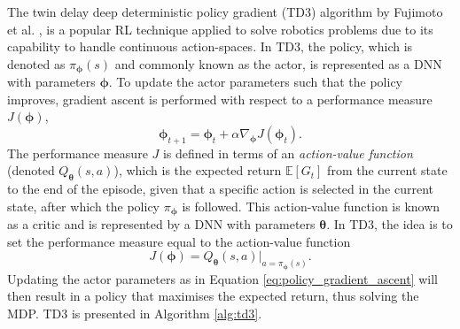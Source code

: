 The twin delay deep deterministic policy gradient (TD3) algorithm by Fujimoto et al. \cite{Fujimoto2018}, is a popular RL technique applied to solve robotics problems due to its capability to handle continuous action-spaces.
In TD3, the policy, which is denoted as $\pi_{\bm{\phi}}(s)$ and commonly known as the actor, is represented as a DNN with parameters $\bm{\phi}$.
To update the actor parameters such that the policy improves, gradient ascent is performed with respect to a performance measure $J(\bm{\phi})$,
\begin{equation}\label{eq:policy_gradient_ascent}
    \bm{\phi}_{t+1} = \bm{\phi}_{t} + \alpha \nabla_{\bm{\phi}} J(\bm{\phi}_t).
\end{equation}
The performance measure $J$ is defined in terms of an \emph{action-value function} (denoted $Q_{\bm{\theta}}(s,a)$), 
which is the expected return $\mathbb{E}[G_t]$ from the current state to the end of the episode, 
given that a specific action is selected in the current state, after which the policy $\pi_{\bm{\phi}}$ is followed.
This action-value function is known as a critic and is represented by a DNN with parameters $\bm{\theta}$.
In TD3, the idea is to set the performance measure equal to the action-value function
\begin{equation}
    J(\bm{\phi}) = Q_{\bm{\theta}}(s,a)| _{a=\pi_{\bm{\phi}}(s)}.
\end{equation}
Updating the actor parameters as in Equation \ref{eq:policy_gradient_ascent} will then result in a policy that maximises the expected return, thus solving the MDP. 
TD3 is presented in Algorithm \ref{alg:td3}.



